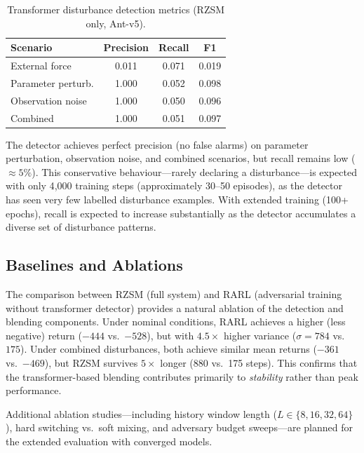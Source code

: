 \documentclass[conference]{IEEEtran}
\begin{document}
\begin{table}[!t]
\caption{Transformer disturbance detection metrics (RZSM only, Ant-v5).}
\label{tab:detection}
\centering
\footnotesize
\begin{tabular}{lccc}
\toprule
Scenario & Precision & Recall & F1 \\
\midrule
External force     & 0.011 & 0.071 & 0.019 \\
Parameter perturb. & 1.000 & 0.052 & 0.098 \\
Observation noise  & 1.000 & 0.050 & 0.096 \\
Combined           & 1.000 & 0.051 & 0.097 \\
\bottomrule
\end{tabular}
\end{table}

The detector achieves perfect precision (no false alarms) on parameter
perturbation, observation noise, and combined scenarios, but recall
remains low ($\approx 5\%$).  This conservative behaviour---rarely
declaring a disturbance---is expected with only 4{,}000 training steps
(approximately 30--50 episodes), as the detector has seen very few
labelled disturbance examples.  With extended training (100+ epochs),
recall is expected to increase substantially as the detector accumulates
a diverse set of disturbance patterns.

\subsection{Baselines and Ablations}\label{sec:baselines}

The comparison between RZSM (full system) and RARL (adversarial training
without transformer detector) provides a natural ablation of the
detection and blending components.  Under nominal conditions, RARL
achieves a higher (less negative) return ($-444$ vs.\ $-528$), but with
$4.5\times$ higher variance ($\sigma = 784$ vs.\ $175$).  Under
combined disturbances, both achieve similar mean returns ($-361$
vs.\ $-469$), but RZSM survives $5\times$ longer (880 vs.\ 175 steps).
This confirms that the transformer-based blending contributes primarily
to \emph{stability} rather than peak performance.

Additional ablation studies---including history window length
($L \in \{8, 16, 32, 64\}$), hard switching vs.\ soft mixing, and
adversary budget sweeps---are planned for the extended evaluation
with converged models.
\end{document}
